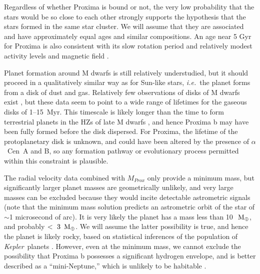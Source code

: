 \documentclass[preprint,12pt]{aastex}
\def\mearth{{\rm\,M_\oplus}}
\def\eg{{\it e.g.\ }}
\def\ie{{\it i.e.\ }}
\def\acen{{$\alpha$~Cen}}
\def\kepler{{\it Kepler}}
\begin{document}
Regardless of whether Proxima is bound or not, the very low
probability that the stars would be so close to each other strongly
supports the hypothesis that the stars formed in the same star
cluster. We will assume that they are associated and have
approximately equal ages and similar compositions. An age near 5 Gyr
for Proxima is also consistent with its slow rotation period and relatively
modest activity levels and magnetic field \citep{ReinersBasri08}. 

Planet formation around M dwarfs is still relatively understudied, but
it should proceed in a qualitatively similar way as for Sun-like stars,
\ie the planet forms from a disk of dust and gas. Relatively few
observations of disks of M dwarfs exist
\citep[\eg][]{Hernandez07,WilliamsCieza11,Luhman12,Downes15}, but
these data seem to point to a wide range of lifetimes for the gaseous
disks of 1--15~Myr. This timescale is likely longer than the time to form
terrestrial planets in the HZs of late M dwarfs
\citep{Raymond07,Lissauer07}, and hence Proxima b may have been fully
formed before the disk dispersed. For Proxima, the lifetime of the
protoplanetary disk is unknown, and could have been altered by the
presence of \acen~A and B, so any formation pathway or evolutionary
process permitted within this constraint is plausible.

The radial velocity data combined with $M_{Prox}$ only provide a
minimum mass, but significantly larger planet masses are geometrically
unlikely, and very large masses can be excluded because they would
incite detectable astrometric signals (note that the minimum mass
solution predicts an astrometric orbit of the star of $\sim$1
microsecond of arc). It is very likely the planet has a mass less than
10~$\mearth$, and probably $<~3~\mearth$. We will assume the latter
possibility is true, and hence the planet is likely rocky, based on
statistical inferences of the population of \kepler~planets
\citep{WeissMarcy14,Rogers15}. However, even at the minimum mass, we
cannot exclude the possibility that Proxima b possesses a significant
hydrogen envelope, and is better described as a ``mini-Neptune,''
which is unlikely to be habitable \citep[but
  see][]{PierrehumbertGaidos11}.
\end{document}
